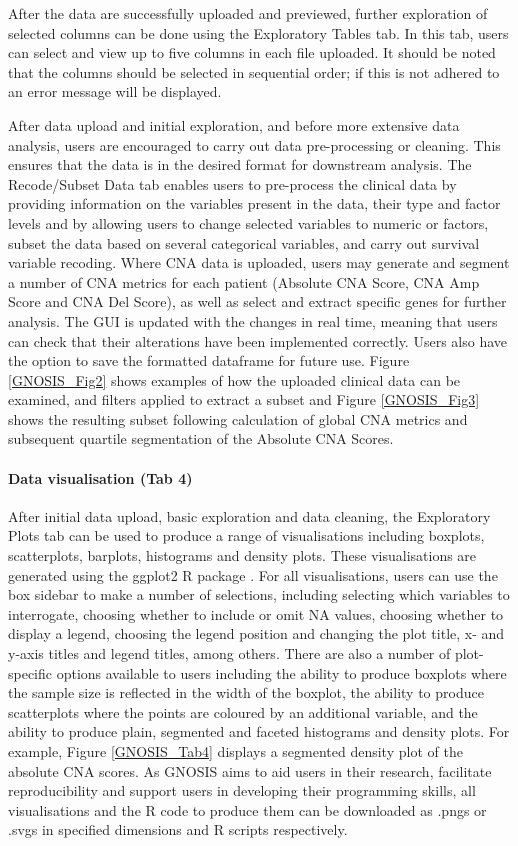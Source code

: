 After the data are successfully uploaded and previewed, further exploration of selected columns can be done using the Exploratory Tables tab. In this tab, users can select and view up to five columns in each file uploaded. It should be noted that the columns should be selected in sequential order; if this is not adhered to an error message will be displayed.  

After data upload and initial exploration, and before more extensive data analysis, users are encouraged to carry out data pre-processing or cleaning. This ensures that the data is in the desired format for downstream analysis. The Recode/Subset Data tab enables users to pre-process the clinical data by providing information on the variables present in the data, their type and factor levels and by allowing users to change selected variables to numeric or factors, subset the data based on several categorical variables, and carry out survival variable recoding. Where CNA data is uploaded, users may generate and segment a number of CNA metrics for each patient (Absolute CNA Score, CNA Amp Score and CNA Del Score), as well as select and extract specific genes for further analysis. The GUI is updated with the changes in real time, meaning that users can check that their alterations have been implemented correctly. Users also have the option to save the formatted dataframe for future use.   
Figure \ref{GNOSIS_Fig2} shows examples of how the uploaded clinical data can be examined, and filters applied to extract a subset and Figure \ref{GNOSIS_Fig3} shows the resulting subset following calculation of global CNA metrics and subsequent quartile segmentation of the Absolute CNA Scores. 

\paragraph{Data visualisation (Tab 4)}
\hfill

\noindent After initial data upload, basic exploration and data cleaning, the Exploratory Plots tab can be used to produce a range of visualisations including boxplots, scatterplots, barplots, histograms and density plots. These visualisations are generated using the ggplot2 R package \citep{ggplot2}. For all visualisations, users can use the box sidebar to make a number of selections, including selecting which variables to interrogate, choosing whether to include or omit NA values, choosing whether to display a legend, choosing the legend position and changing the plot title, x- and y-axis titles and legend titles, among others. There are also a number of plot-specific options available to users including the ability to produce boxplots where the sample size is reflected in the width of the boxplot, the ability to produce scatterplots where the points are coloured by an additional variable, and the ability to produce plain, segmented and faceted histograms and density plots. For example, Figure \ref{GNOSIS_Tab4} displays a segmented density plot of the absolute CNA scores. As GNOSIS aims to aid users in their research, facilitate reproducibility and support users in developing their programming skills, all visualisations and the R code to produce them can be downloaded as .pngs or .svgs in specified dimensions and R scripts respectively.  

